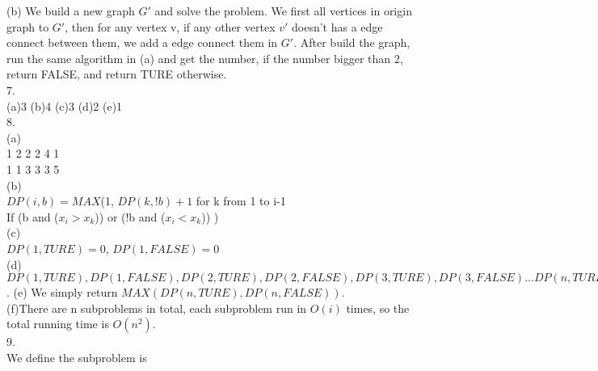 \documentclass[12pt,twoside]{article}
\begin{document}
(b) We build a new graph $G'$ and solve the problem. We first all vertices in origin graph to $G'$, then for any vertex v, if any other vertex $v'$ doesn't has a edge connect between them, we add a edge connect them in $G'$. After build the graph, run the same algorithm in (a) and get the number, if the number bigger than 2, return FALSE, and return TURE otherwise.\\
7.\\
(a)3 (b)4 (c)3 (d)2 (e)1\\
8.\\
(a)\\
1 2 2 2 4 1\\
1 1 3 3 3 5\\
(b)\\
$DP(i,b)=MAX$(1, $DP(k,!b)+1$ for k from 1 to i-1\\
If (b and ($x_i>x_k$)) or (!b and ($x_i<x_k$))
)\\
(c)\\
$DP(1,TURE)=0$, $DP(1,FALSE)=0$\\
(d)\\
$DP(1,TURE),DP(1,FALSE),DP(2,TURE),DP(2,FALSE),DP(3,TURE),DP(3,FALSE).
..DP(n,TURE),DP(n,FALSE)$.
(e) We simply return $MAX(DP(n,TURE),DP(n,FALSE))$.\\
(f)There are n subproblems in total, each subproblem run in $O(i)$ times, so the total running time is $O(n^2)$.\\
9.\\
We define the subproblem is \\
\end{document}

